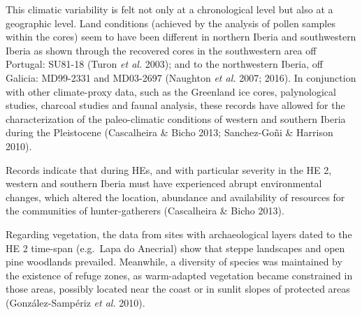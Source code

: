 \documentclass[12pt,twoside]{reedthesis}
\begin{document}
This climatic variability is felt not only at a chronological level but also at a geographic level. Land conditions (achieved by the analysis of pollen samples within the cores) seem to have been different in northern Iberia and southwestern Iberia as shown through the recovered cores in the southwestern area off Portugal: SU81-18 (Turon \emph{et al.} 2003); and to the northwestern Iberia, off Galicia: MD99-2331 and MD03-2697 (Naughton \emph{et al.} 2007; 2016). In conjunction with other climate-proxy data, such as the Greenland ice cores, palynological studies, charcoal studies and faunal analysis, these records have allowed for the characterization of the paleo-climatic conditions of western and southern Iberia during the Pleistocene (Cascalheira \& Bicho 2013; Sanchez-Goñi \& Harrison 2010).

Records indicate that during HEs, and with particular severity in the HE 2, western and southern Iberia must have experienced abrupt environmental changes, which altered the location, abundance and availability of resources for the communities of hunter-gatherers (Cascalheira \& Bicho 2013).

Regarding vegetation, the data from sites with archaeological layers dated to the HE 2 time-span (e.g.~Lapa do Anecrial) show that steppe landscapes and open pine woodlands prevailed. Meanwhile, a diversity of species was maintained by the existence of refuge zones, as warm-adapted vegetation became constrained in those areas, possibly located near the coast or in sunlit slopes of protected areas (González-Sampériz \emph{et al.} 2010).
\end{document}
